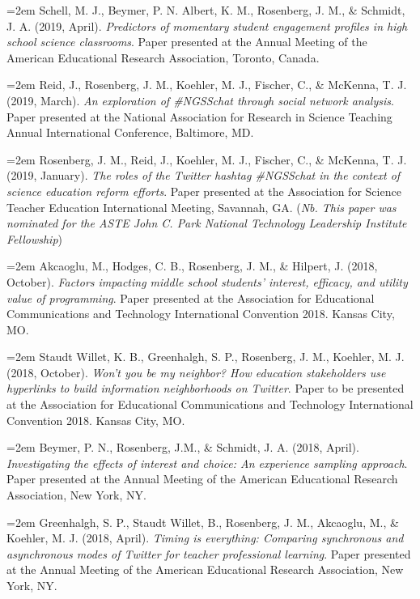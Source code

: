 \documentclass[14,]{article}
\begin{document}
\hangindent=2em Schell, M. J., Beymer, P. N. Albert, K. M., Rosenberg,
J. M., \& Schmidt, J. A. (2019, April). \emph{Predictors of momentary
student engagement profiles in high school science classrooms}. Paper
presented at the Annual Meeting of the American Educational Research
Association, Toronto, Canada.

\hangindent=2em Reid, J., Rosenberg, J. M., Koehler, M. J., Fischer, C.,
\& McKenna, T. J. (2019, March). \emph{An exploration of \#NGSSchat
through social network analysis}. Paper presented at the National
Association for Research in Science Teaching Annual International
Conference, Baltimore, MD.

\hangindent=2em Rosenberg, J. M., Reid, J., Koehler, M. J., Fischer, C.,
\& McKenna, T. J. (2019, January). \emph{The roles of the Twitter
hashtag \#NGSSchat in the context of science education reform efforts}.
Paper presented at the Association for Science Teacher Education
International Meeting, Savannah, GA. (\emph{Nb. This paper was nominated
for the ASTE John C. Park National Technology Leadership Institute
Fellowship})

\hangindent=2em Akcaoglu, M., Hodges, C. B., Rosenberg, J. M., \&
Hilpert, J. (2018, October). \emph{Factors impacting middle school
students' interest, efficacy, and utility value of programming}. Paper
presented at the Association for Educational Communications and
Technology International Convention 2018. Kansas City, MO.

\hangindent=2em Staudt Willet, K. B., Greenhalgh, S. P., Rosenberg, J.
M., Koehler, M. J. (2018, October). \emph{Won't you be my neighbor? How
education stakeholders use hyperlinks to build information neighborhoods
on Twitter}. Paper to be presented at the Association for Educational
Communications and Technology International Convention 2018. Kansas
City, MO.

\hangindent=2em Beymer, P. N., Rosenberg, J.M., \& Schmidt, J. A. (2018,
April). \emph{Investigating the effects of interest and choice: An
experience sampling approach}. Paper presented at the Annual Meeting of
the American Educational Research Association, New York, NY.

\hangindent=2em Greenhalgh, S. P., Staudt Willet, B., Rosenberg, J. M.,
Akcaoglu, M., \& Koehler, M. J. (2018, April). \emph{Timing is
everything: Comparing synchronous and asynchronous modes of Twitter for
teacher professional learning}. Paper presented at the Annual Meeting of
the American Educational Research Association, New York, NY.
\end{document}
